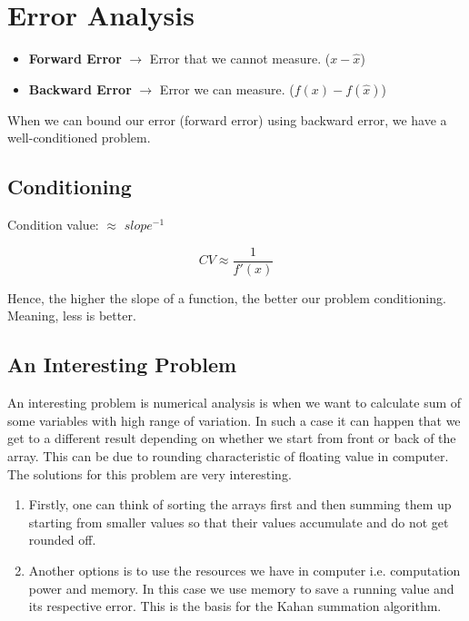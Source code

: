 \section*{Error Analysis}

\begin{itemize}
  \item \textbf{Forward Error} $\rightarrow$ Error that we cannot measure. ($x - \hat{x}$)
  \item \textbf{Backward Error} $\rightarrow$ Error we can measure. ($f(x) - f(\hat{x})$)
\end{itemize}

When we can bound our error (forward error) using backward error, we have a well-conditioned problem.

\subsection*{Conditioning}

Condition value: $\approx$ $slope^{-1}$

\begin{equation}
  CV \approx \frac{1}{f'(x)}
\end{equation}

Hence, the higher the slope of a function, the better our problem conditioning. Meaning, less is better.

\subsection*{An Interesting Problem}

An interesting problem is numerical analysis is when we want to calculate sum of some variables with high range of variation.
In such a case it can happen that we get to a different result depending on whether we start from front or back of the array.
This can be due to rounding characteristic of floating value in computer. The solutions for this problem are very interesting.

\begin{enumerate}
  \item Firstly, one can think of sorting the arrays first and then summing them up starting from smaller values so that their values accumulate
    and do not get rounded off.
  \item Another options is to use the resources we have in computer i.e. computation power and memory. In this case we use memory to save a running
    value and its respective error. This is the basis for the Kahan summation algorithm.
\end{enumerate}

